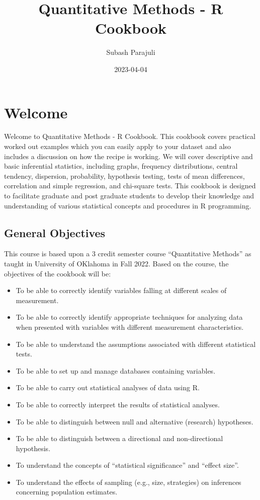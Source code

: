 \documentclass[
]{book}
\title{Quantitative Methods - R Cookbook}
\author{Subash Parajuli}
\date{2023-04-04}
\begin{document}
\maketitle

{
\setcounter{tocdepth}{1}
\tableofcontents
}
\hypertarget{welcome}{%
\chapter*{Welcome}\label{welcome}}

Welcome to Quantitative Methods - R Cookbook. This cookbook covers practical worked out examples which you can easily apply to your dataset and also includes a discussion on how the recipe is working. We will cover descriptive and basic inferential statistics, including graphs, frequency distributions, central tendency, dispersion, probability, hypothesis testing, tests of mean differences, correlation and simple regression, and chi-square tests. This cookbook is designed to facilitate graduate and post graduate students to develop their knowledge and understanding of various statistical concepts and procedures in R programming.

\hypertarget{general-objectives}{%
\section*{General Objectives}\label{general-objectives}}

This course is based upon a 3 credit semester course ``Quantitative Methods'' as taught in University of OKlahoma in Fall 2022. Based on the course, the objectives of the cookbook will be:

\begin{itemize}
\item
  To be able to correctly identify variables falling at different scales of measurement.
\item
  To be able to correctly identify appropriate techniques for analyzing data when presented with variables with different measurement characteristics.
\item
  To be able to understand the assumptions associated with different statistical tests.
\item
  To be able to set up and manage databases containing variables.
\item
  To be able to carry out statistical analyses of data using R.
\item
  To be able to correctly interpret the results of statistical analyses.
\item
  To be able to distinguish between null and alternative (research) hypotheses.
\item
  To be able to distinguish between a directional and non-directional hypothesis.
\item
  To understand the concepts of ``statistical significance'' and ``effect size''.
\item
  To understand the effects of sampling (e.g., size, strategies) on inferences concerning population estimates.
\end{itemize}
\end{document}
